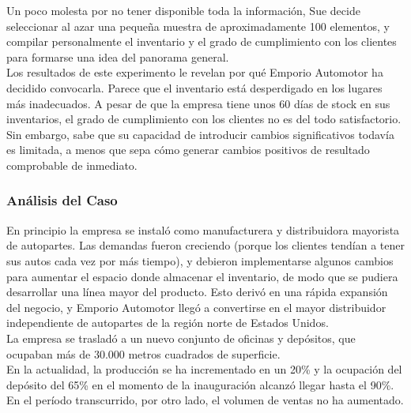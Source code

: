 \documentclass[a4paper,10pt,titlepage]{article}
\begin{document}
		\indent Un poco molesta por no tener disponible toda la informaci\'on, Sue decide seleccionar al azar una pequeña muestra de aproximadamente 100 elementos, y compilar personalmente el inventario y el grado de cumplimiento con los clientes para formarse una idea del panorama general.\\
		\indent Los resultados de este experimento le revelan por qu\'e Emporio Automotor ha decidido convocarla. Parece que el inventario est\'a desperdigado en los lugares m\'as inadecuados. A pesar de que la empresa tiene unos 60 d\'ias de stock en sus inventarios, el grado de cumplimiento con los clientes no es del todo satisfactorio. \\
		\indent Sin embargo, sabe que su capacidad de introducir cambios significativos todav\'ia es limitada, a menos que sepa c\'omo generar cambios positivos de resultado comprobable de inmediato.\\

\newpage
\subsubsection {An\'alisis del Caso}
		
		\indent En principio la empresa se instal\'o como manufacturera y distribuidora mayorista de autopartes. Las demandas fueron creciendo (porque los clientes tend\'ian a tener sus autos cada vez por m\'as tiempo), y debieron implementarse algunos cambios para aumentar el espacio donde almacenar el inventario, de modo que se pudiera desarrollar una l\'inea mayor del producto. Esto deriv\'o en una r\'apida expansi\'on del negocio, y Emporio Automotor lleg\'o a convertirse en el mayor distribuidor independiente de autopartes de la regi\'on norte de Estados Unidos.\\
		\indent La empresa se traslad\'o a un nuevo conjunto de oficinas y dep\'ositos, que ocupaban m\'as de 30.000 metros cuadrados de superficie.\\
		\indent En la actualidad, la producci\'on se ha incrementado en un 20\% y la ocupaci\'on del dep\'osito del 65\% en el momento de la inauguraci\'on alcanz\'o llegar hasta el 90\%. 
		\indent En el per\'iodo transcurrido, por otro lado, el volumen de ventas no ha aumentado.\\
\end{document}
